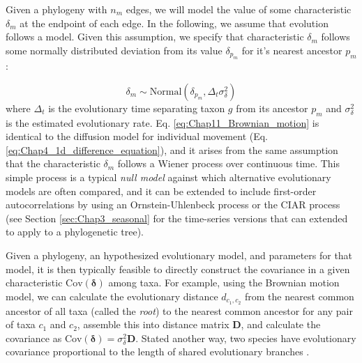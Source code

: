 Given a phylogeny with \(n_m\) edges, we will model the value of some characteristic \(\delta_m\) at the endpoint of each edge.  In the following, we assume that evolution follows a  model.  Given this assumption, we specify that characteristic \(\delta_m\) follows some normally distributed deviation from its value \( \delta_{p_m} \) for it's nearest ancestor \(p_m\):

\begin{equation} \label{eq:Chap11_Brownian_motion}
    \delta_m \sim \mathrm{Normal}( \delta_{p_m}, \Delta_t \sigma_{\delta}^2 )
\end{equation}
where \( \Delta_t \) is the evolutionary time separating taxon \(g\) from its ancestor \(p_m\) and \( \sigma_{\delta}^2 \) is the estimated evolutionary rate. Eq. \ref{eq:Chap11_Brownian_motion} is identical to the diffusion model for individual movement (Eq. \ref{eq:Chap4_1d_difference_equation}), and it arises from the same assumption that the characteristic \(\delta_m\) follows a Wiener process over continuous time.  This simple process is a typical \textit{null model} against which alternative evolutionary models are often compared, and it can be extended to include first-order autocorrelations by using an Ornstein-Uhlenbeck process or the CIAR process (see Section \ref{sec:Chap3_seasonal} for the time-series versions that can extended to apply to a phylogenetic tree).

Given a phylogeny, an hypothesized evolutionary model, and parameters for that model, it is then typically feasible to directly construct the covariance in a given characteristic \(\mathrm{Cov}(\mathbf{\delta})\) among taxa.  For example, using the Brownian motion model, we can calculate the evolutionary distance \( d_{c_1,c_2} \) from the nearest common ancestor of all taxa (called the \textit{root}) to the nearest common ancestor for any pair of taxa \(c_1\) and \(c_2\), assemble this into distance matrix \(\mathbf{D}\), and calculate the covariance as \( \mathrm{Cov}(\mathbf{\delta}) = \sigma_{\delta}^2 \mathbf{D} \).  Stated another way, two species have evolutionary covariance proportional to the length of shared evolutionary branches \cite{harmon_phylogenetic_2018}.   

